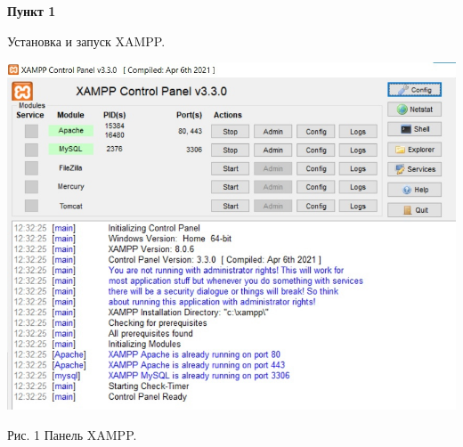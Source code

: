 \documentclass[a4paper,14pt]{extarticle}
\begin{document}
    \textbf{Пункт 1}
    \vspace{-3ex}
    \begin{center}
        \singlespacing
        Установка и запуск XAMPP.

        \includegraphics[scale=0.4]{pics/1.jpg}

       Рис. 1 Панель XAMPP.
    \end{center}
\end{document}
